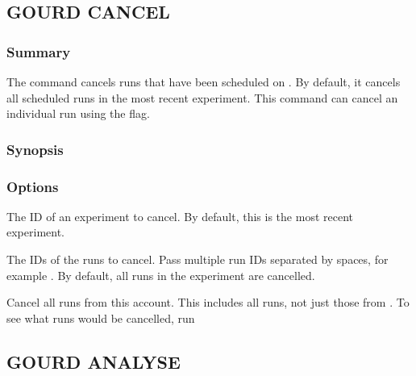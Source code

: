 \documentclass[a4paper,english]{article}
\begin{document}
\begin{adjustwidth}{18pt}{0pt}
        \subsection{GOURD CANCEL}

            \subsubsection{Summary}
                The   command cancels runs that have been scheduled on .
                By default, it cancels all scheduled runs in the most recent experiment.
                This command can cancel an individual run using the  flag.

            \subsubsection{Synopsis}
                 

            \subsubsection{Options}
                \begin{Description}[Options]
                  \item[\Arg{experiment-id}]
                    The ID of an experiment to cancel.
                    By default, this is the most recent experiment.
                  \item[\OptArg{-i}{ run-ids}]
                    The IDs of the runs to cancel.
                    Pass multiple run IDs separated by spaces, for example .
                    By default, all runs in the experiment are cancelled.
                  \item[\Opt{--all}]
                    Cancel all runs from this account.
                    This includes all runs, not just those from .
                    To see what runs would be cancelled, run    
                \end{Description}


        \subsection{GOURD ANALYSE}


\end{adjustwidth}
\end{document}
